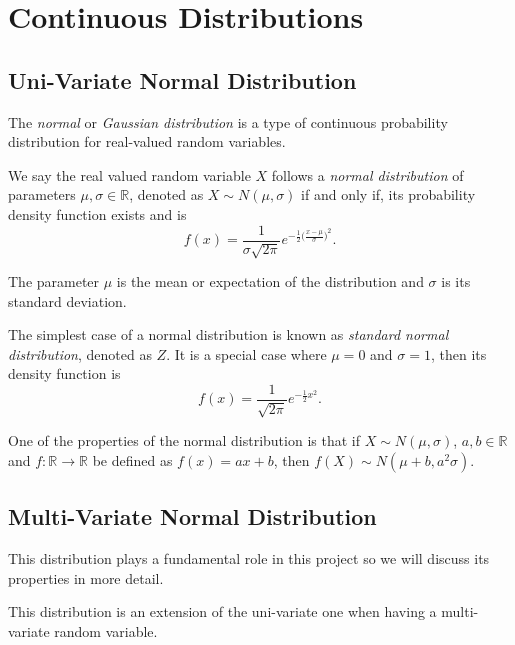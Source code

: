 \section{Continuous Distributions}

\subsection{Uni-Variate Normal Distribution}

The \emph{normal} or \emph{Gaussian distribution} is a type of continuous
probability distribution for real-valued random variables.

\begin{definition}
  We say the real valued random variable \(X\) follows a \emph{normal distribution} of
  parameters \(\mu, \sigma \in \mathbb{R}\), denoted as \(X \sim N(\mu,
  \sigma)\) if and only if, its probability density function exists and is
  \[
    f(x) = \frac{1}{\sigma \sqrt{2\pi}} e^{-\frac{1}{2}\big(\frac{x-\mu}{\sigma} \big)^2}.
  \]

  The parameter \(\mu\) is the mean or expectation of the distribution and
  \(\sigma\) is its standard deviation.

\end{definition}

The simplest case of a normal distribution is known as \emph{standard normal
  distribution}, denoted as \(Z\). It is a special case where \(\mu = 0\) and \(\sigma = 1\), then
its density function is
\[
  f(x) = \frac{1}{\sqrt{2\pi}}e^{-\frac{1}{2}x^2}.
\]

One of the properties of the normal distribution is that if \(X \sim N(\mu, \sigma)\), \(a,b \in \mathbb{R}\) and \(f:\mathbb{R} \to \mathbb{R}\) be defined
as \(f(x) = ax + b\), then \(f(X) \sim N(\mu + b, a^2 \sigma)\).

\subsection{Multi-Variate Normal Distribution}

This distribution plays a fundamental role in this project so we will discuss
its properties in more detail.

This distribution is an extension of the uni-variate one when having a
multi-variate random variable.

